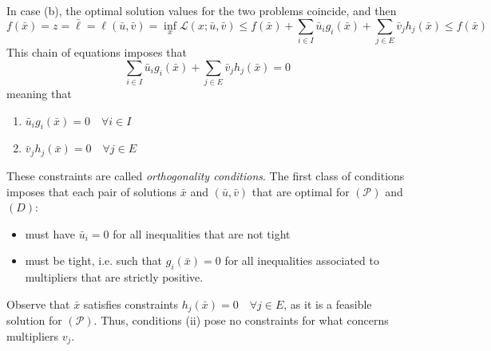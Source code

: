 \documentclass{book}
\theoremstyle{theoremv2}
\theoremstyle{defv2}
\theoremstyle{remark}
\theoremstyle{remark}
\begin{document}
In case (b), the optimal solution values for the two problems coincide, and then 
\[
    f(\bar{x}) = z = \bar{\ell} = \ell (\bar{u},\bar{v}) = \inf_x \mathcal{L}(x;\bar{u},\bar{v})\leq f(\bar{x}) + \displaystyle\sum_{i\in I}\bar{u}_ig_i(\bar{x}) + \displaystyle\sum_{j\in E}\bar{v}_jh_j(\bar{x})\leq f(\bar{x})
\]
This chain of equations imposes that 
\[
    \displaystyle\sum_{i\in I}\bar{u}_ig_i(\bar{x}) + \displaystyle\sum_{j\in E}\bar{v}_jh_j(\bar{x}) = 0
\]
meaning that 
\begin{enumerate}[label=(\roman*)]
    \item $\bar{u}_ig_i(\bar{x}) =0 \quad \forall i \in I$
    \item $\bar{v}_jh_j(\bar{x}) =0 \quad \forall j \in E$
\end{enumerate}
These constraints are called \emph{orthogonality conditions}. The first class of conditions imposes that each pair of solutions $\bar{x}$ and $(\bar{u},\bar{v})$ that are optimal for $(\mathcal{P})$ and $(D)$:
\begin{itemize}
    \item must have $\bar{u}_i=0$ for all inequalities that are not tight
    \item must be tight, i.e. such that $g_i(\bar{x})=0$ for all inequalities associated to multipliers that are strictly positive.
\end{itemize}
Observe that $\bar{x}$ satisfies constraints $h_j(\bar{x})=0 \quad \forall j \in E$, as it is a feasible solution for $(\mathcal{P})$. Thus, conditions (ii) pose no constraints for what concerns multipliers $v_j$.
\end{document}
